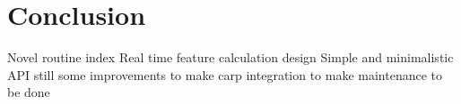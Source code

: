 \chapter{Conclusion}
\label{chapter:08}
Novel routine index
Real time feature calculation design
Simple and minimalistic API
still some improvements to make
carp integration to make
maintenance to be done
